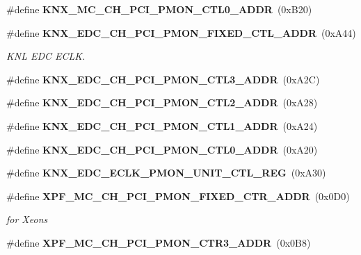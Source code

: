 \begin{DoxyCompactItemize}
\item 
\mbox{\label{types_8h_a97bcc1b1d15543bc3f1cf52de745cf6f}} 
\#define {\bfseries K\+N\+X\+\_\+\+M\+C\+\_\+\+C\+H\+\_\+\+P\+C\+I\+\_\+\+P\+M\+O\+N\+\_\+\+C\+T\+L0\+\_\+\+A\+D\+DR}~(0x\+B20)
\item 
\mbox{\label{types_8h_a6c7c870f68e25f91d1cf98d34222e918}} 
\#define \textbf{ K\+N\+X\+\_\+\+E\+D\+C\+\_\+\+C\+H\+\_\+\+P\+C\+I\+\_\+\+P\+M\+O\+N\+\_\+\+F\+I\+X\+E\+D\+\_\+\+C\+T\+L\+\_\+\+A\+D\+DR}~(0x\+A44)
\begin{DoxyCompactList}\small\item\em K\+NL E\+DC E\+C\+LK. \end{DoxyCompactList}\item 
\mbox{\label{types_8h_aa1d5cd15b901280cb37f15a708443310}} 
\#define {\bfseries K\+N\+X\+\_\+\+E\+D\+C\+\_\+\+C\+H\+\_\+\+P\+C\+I\+\_\+\+P\+M\+O\+N\+\_\+\+C\+T\+L3\+\_\+\+A\+D\+DR}~(0x\+A2\+C)
\item 
\mbox{\label{types_8h_a9030bdd0671b4a2cd9252c6327259011}} 
\#define {\bfseries K\+N\+X\+\_\+\+E\+D\+C\+\_\+\+C\+H\+\_\+\+P\+C\+I\+\_\+\+P\+M\+O\+N\+\_\+\+C\+T\+L2\+\_\+\+A\+D\+DR}~(0x\+A28)
\item 
\mbox{\label{types_8h_acf92cabe00b812238031eadf68ed27e3}} 
\#define {\bfseries K\+N\+X\+\_\+\+E\+D\+C\+\_\+\+C\+H\+\_\+\+P\+C\+I\+\_\+\+P\+M\+O\+N\+\_\+\+C\+T\+L1\+\_\+\+A\+D\+DR}~(0x\+A24)
\item 
\mbox{\label{types_8h_a67068081f684ed8f19ada360109ee7b0}} 
\#define {\bfseries K\+N\+X\+\_\+\+E\+D\+C\+\_\+\+C\+H\+\_\+\+P\+C\+I\+\_\+\+P\+M\+O\+N\+\_\+\+C\+T\+L0\+\_\+\+A\+D\+DR}~(0x\+A20)
\item 
\mbox{\label{types_8h_a02a6d95f2df5c79e839fb0126f755d78}} 
\#define {\bfseries K\+N\+X\+\_\+\+E\+D\+C\+\_\+\+E\+C\+L\+K\+\_\+\+P\+M\+O\+N\+\_\+\+U\+N\+I\+T\+\_\+\+C\+T\+L\+\_\+\+R\+EG}~(0x\+A30)
\item 
\mbox{\label{types_8h_ac705b2f8dddc8e2bd6e1e154bb694526}} 
\#define \textbf{ X\+P\+F\+\_\+\+M\+C\+\_\+\+C\+H\+\_\+\+P\+C\+I\+\_\+\+P\+M\+O\+N\+\_\+\+F\+I\+X\+E\+D\+\_\+\+C\+T\+R\+\_\+\+A\+D\+DR}~(0x0\+D0)
\begin{DoxyCompactList}\small\item\em for Xeons \end{DoxyCompactList}\item 
\mbox{\label{types_8h_a3c527fdd852932e6272dc9fad67a6315}} 
\#define {\bfseries X\+P\+F\+\_\+\+M\+C\+\_\+\+C\+H\+\_\+\+P\+C\+I\+\_\+\+P\+M\+O\+N\+\_\+\+C\+T\+R3\+\_\+\+A\+D\+DR}~(0x0\+B8)
\item 

\end{DoxyCompactItemize}
